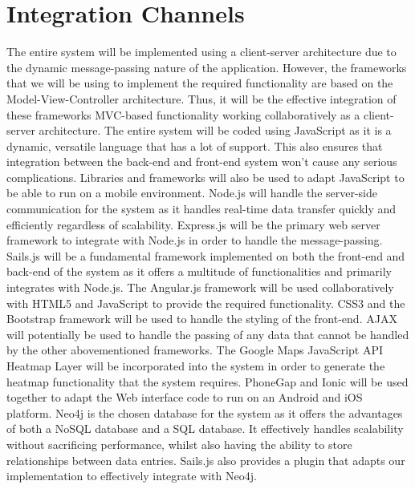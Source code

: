 \documentclass[11pt,fleqn]{book} %
\begin{document}
	\section{Integration Channels}
	The entire system will be implemented using a client-server architecture due to the dynamic message-passing nature of the application. However, the frameworks that we will be using to implement the required functionality are based on the Model-View-Controller architecture. Thus, it will be the effective integration of these frameworks MVC-based functionality working collaboratively as a client-server architecture. The entire system will be coded using JavaScript as it is a dynamic, versatile language that has a lot of support. This also ensures that integration between the back-end and front-end system won’t cause any serious complications. Libraries and frameworks will also be used to adapt JavaScript to be able to run on a mobile environment.\newline\newline
	Node.js will handle the server-side communication for the system as it handles real-time data transfer quickly and efficiently regardless of scalability. Express.js will be the primary web server framework to integrate with Node.js in order to handle the message-passing. Sails.js will be a fundamental framework implemented on both the front-end and back-end of the system as it offers a multitude of functionalities and primarily integrates with Node.js. The Angular.js framework will be used collaboratively with HTML5 and JavaScript to provide the required functionality. CSS3 and the Bootstrap framework will be used to handle the styling of the front-end. AJAX will potentially be used to handle the passing of any data that cannot be handled by the other abovementioned frameworks. The Google Maps JavaScript API Heatmap Layer will be incorporated into the system in order to generate the heatmap functionality that the system requires. PhoneGap and Ionic will be used together to adapt the Web interface code to run on an Android  and iOS platform.\newline\newline
	Neo4j is the chosen database for the system as it offers the advantages of both a NoSQL database and a SQL database. It effectively handles scalability without sacrificing performance, whilst also having the ability to store relationships between data entries. Sails.js also provides a plugin that adapts our implementation to effectively integrate with Neo4j.
	
\end{document}
